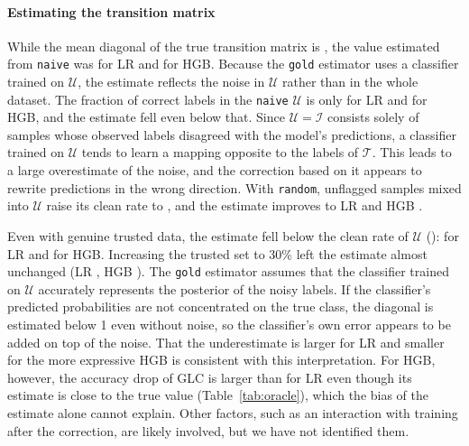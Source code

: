\documentclass[a4paper,10pt]{article}
\newcommand{\method}[1]{\texttt{#1}}
\begin{document}
\paragraph{Estimating the transition matrix}
While the mean diagonal of the true transition matrix is \MechLRTrueDiag{}, the value estimated from \method{naive} was \MechLRNaiveDiag{} for LR and \MechHGBNaiveDiag{} for HGB.
Because the \texttt{gold} estimator uses a classifier trained on $\mathcal{U}$, the estimate reflects the noise in $\mathcal{U}$ rather than in the whole dataset.
The fraction of correct labels in the \method{naive} $\mathcal{U}$ is only \MechLRNaiveUClean{} for LR and \MechHGBNaiveUClean{} for HGB, and the estimate fell even below that.
Since $\mathcal{U} = \mathcal{I}$ consists solely of samples whose observed labels disagreed with the model's predictions, a classifier trained on $\mathcal{U}$ tends to learn a mapping opposite to the labels of $\mathcal{T}$.
This leads to a large overestimate of the noise, and the correction based on it appears to rewrite predictions in the wrong direction.
With \method{random}, unflagged samples mixed into $\mathcal{U}$ raise its clean rate to \MechLRRandomUClean{}, and the estimate improves to LR \MechLRRandomDiag{} and HGB \MechHGBRandomDiag{}.

Even with genuine trusted data, the estimate fell below the clean rate of $\mathcal{U}$ (\MechLROracleTenUClean{}): \MechLROracleTenDiag{} for LR and \MechHGBOracleTenDiag{} for HGB.
Increasing the trusted set to 30\% left the estimate almost unchanged (LR \MechLROracleThirtyDiag{}, HGB \MechHGBOracleThirtyDiag{}).
The \texttt{gold} estimator assumes that the classifier trained on $\mathcal{U}$ accurately represents the posterior of the noisy labels.
If the classifier's predicted probabilities are not concentrated on the true class, the diagonal is estimated below 1 even without noise, so the classifier's own error appears to be added on top of the noise.
That the underestimate is larger for LR and smaller for the more expressive HGB is consistent with this interpretation.
For HGB, however, the accuracy drop of GLC is larger than for LR even though its estimate is close to the true value (Table~\ref{tab:oracle}), which the bias of the estimate alone cannot explain.
Other factors, such as an interaction with training after the correction, are likely involved, but we have not identified them.
\end{document}

